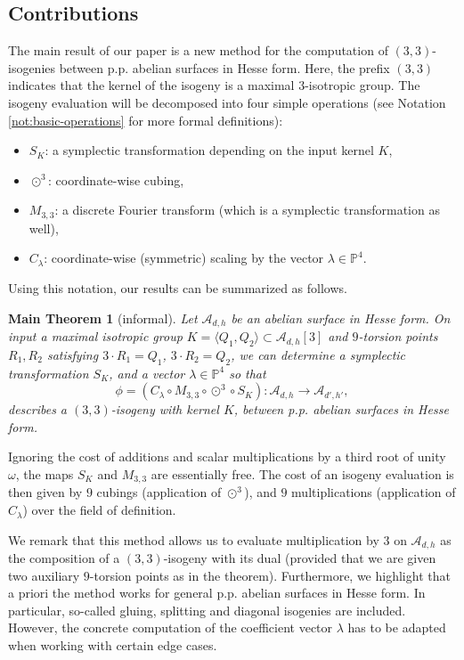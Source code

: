 \documentclass[11pt]{amsart}
\newtheorem*{theorem*}{Main Theorem}
\theoremstyle{definition}
\newcommand{\A}{\mathcal{A}}
\newcommand{\PP}{\mathbb{P}}
\newcommand{\cube}{\odot^3}
\begin{document}
\subsection{Contributions}
The main result of our paper is a new method for the computation of $(3,3)$-isogenies between p.p. abelian surfaces in Hesse form. Here, the prefix $(3,3)$ indicates that the kernel of the isogeny is a maximal $3$-isotropic group. The isogeny evaluation will be decomposed into four simple operations (see Notation \ref{not:basic-operations} for more formal definitions):
\begin{itemize}
    \item $S_K$: a symplectic transformation depending on the input kernel $K$,
    \item $\cube$: coordinate-wise cubing,
    \item $M_{3,3}$: a discrete Fourier transform (which is a symplectic transformation as well),
    \item $C_\lambda$: coordinate-wise (symmetric) scaling by the vector $\lambda \in \PP^4$.
\end{itemize}

Using this notation, our results can be summarized as follows.
\begin{theorem*}[informal]
    Let $\A_{d,h}$ be an abelian surface in Hesse form. On input a maximal isotropic group $K = \langle Q_1,Q_2\rangle \subset \A_{d,h}[3]$ and $9$-torsion points $R_1,R_2$ satisfying $3\cdot R_1 = Q_1$, $3\cdot R_2 = Q_2$, we can determine a symplectic transformation $S_K$, and a vector $\lambda \in \PP^4$ 
    so that 
    \[
    \phi = (C_\lambda \circ M_{3,3} \circ \cube \circ S_K): \A_{d,h} \to \A_{d',h'},
    \]
    describes a $(3,3)$-isogeny with kernel $K$, between p.p. abelian surfaces in Hesse form.
\end{theorem*}

Ignoring the cost of additions and scalar multiplications by a third root of unity $\omega$, the maps $S_K$ and $M_{3,3}$ are essentially free. The cost of an isogeny evaluation is then given by $9$ cubings (application of  $\cube$), and  $9$ multiplications (application of $C_\lambda$) over the field of definition. 

We remark that this method allows us to evaluate multiplication by $3$ on $\A_{d,h}$ as the composition of a $(3,3)$-isogeny with its dual (provided that we are given two auxiliary $9$-torsion points as in the theorem).
Furthermore, we highlight that a priori the method  works for general p.p. abelian surfaces in Hesse form. In particular, so-called gluing, splitting and diagonal isogenies are included. However, the concrete computation of the coefficient vector $\lambda$ has to be adapted when working with certain edge cases.
\end{document}
